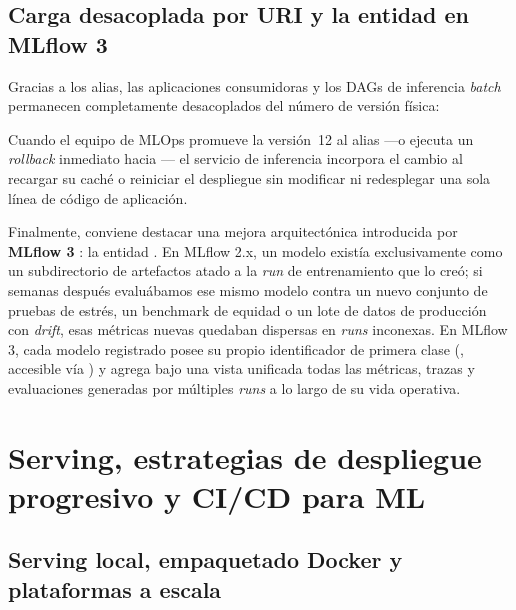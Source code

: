 \subsection{Carga desacoplada por URI y la entidad  en MLflow 3}

Gracias a los alias, las aplicaciones consumidoras y los DAGs de inferencia \textit{batch} permanecen completamente desacoplados del número de versión física:
\begin{center}
\end{center}
Cuando el equipo de MLOps promueve la versión~12 al alias  ---o ejecuta un \textit{rollback} inmediato hacia --- el servicio de inferencia incorpora el cambio al recargar su caché o reiniciar el despliegue sin modificar ni redesplegar una sola línea de código de aplicación.

Finalmente, conviene destacar una mejora arquitectónica introducida por \textbf{MLflow 3} : la entidad \textbf{}. En MLflow 2.x, un modelo existía exclusivamente como un subdirectorio de artefactos atado a la \textit{run} de entrenamiento que lo creó; si semanas después evaluábamos ese mismo modelo contra un nuevo conjunto de pruebas de estrés, un benchmark de equidad o un lote de datos de producción con \textit{drift}, esas métricas nuevas quedaban dispersas en \textit{runs} inconexas. En MLflow 3, cada modelo registrado posee su propio identificador de primera clase (, accesible vía ) y agrega bajo una vista unificada todas las métricas, trazas y evaluaciones generadas por múltiples \textit{runs} a lo largo de su vida operativa.

\section[Serving, despliegue progresivo y CI/CD]{Serving, estrategias de despliegue progresivo y CI/CD para ML}\label{sec:mlflow-serving-cicd}

\subsection{Serving local, empaquetado Docker y plataformas a escala}

